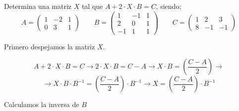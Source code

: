 \begin{ejemplo}
Determina una matriz $X$ tal que $A+2\cdot X \cdot B=C$, siendo:
\[ A=\begin{pmatrix}
1 & -2 & 1 \\
0 & 3 & 1 
\end{pmatrix}
\qquad
B=\begin{pmatrix}
1 & -1 & 1 \\
2 & 0 & 1 \\
-1 & 1 & 1
\end{pmatrix}
\qquad
C=\begin{pmatrix}
1 & 2 & 3 \\ 
8 & -1 & -1 
\end{pmatrix} \]

\tcblower
Primero despejamos la matriz $X$.

\[ A+2\cdot X \cdot B=C \rightarrow 2\cdot X \cdot B=C - A \rightarrow  X \cdot B=\left(\dfrac{C-A}{2} \right) \rightarrow \]
\[ \rightarrow X\cdot B \cdot B^{-1}=\left(\dfrac{C-A}{2} \right) \cdot B^{-1} \rightarrow X=\left(\dfrac{C-A}{2} \right) \cdot B^{-1} \]

Calculamos la inversa de $B$


\end{ejemplo}
